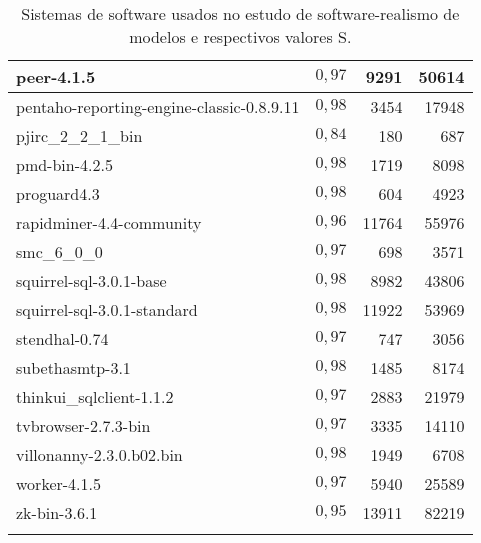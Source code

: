 \begin{center}
\begin{longtable}{| p{10cm} | c | r | r |}
	peer-4.1.5 &  $0,97$ & 9291 & 50614 \\ \hline
	pentaho-reporting-engine-classic-0.8.9.11 &  $0,98$ & 3454 & 17948 \\ \hline
	pjirc\_2\_2\_1\_bin &  $0,84$ & 180 & 687 \\ \hline
	pmd-bin-4.2.5 &  $0,98$ & 1719 & 8098 \\ \hline
	proguard4.3 &  $0,98$ & 604 & 4923 \\ \hline
	rapidminer-4.4-community &  $0,96$ & 11764 & 55976 \\ \hline
	smc\_6\_0\_0 &  $0,97$ & 698 & 3571 \\ \hline
	squirrel-sql-3.0.1-base &  $0,98$ & 8982 & 43806 \\ \hline
	squirrel-sql-3.0.1-standard &  $0,98$ & 11922 & 53969 \\ \hline
	stendhal-0.74 &  $0,97$ & 747 & 3056 \\ \hline
	subethasmtp-3.1 &  $0,98$ & 1485 & 8174 \\ \hline
	thinkui\_sqlclient-1.1.2 &  $0,97$ & 2883 & 21979 \\ \hline
	tvbrowser-2.7.3-bin &  $0,97$ & 3335 & 14110 \\ \hline
	villonanny-2.3.0.b02.bin &  $0,98$ & 1949 & 6708 \\ \hline
	worker-4.1.5 &  $0,97$ & 5940 & 25589 \\ \hline
	zk-bin-3.6.1 &  $0,95$ & 13911 & 82219 \\ \hline
	
	\caption{\label{tab:redes}Sistemas de software usados no estudo de software-realismo de modelos e respectivos valores S.}
\end{longtable}
\end{center}


